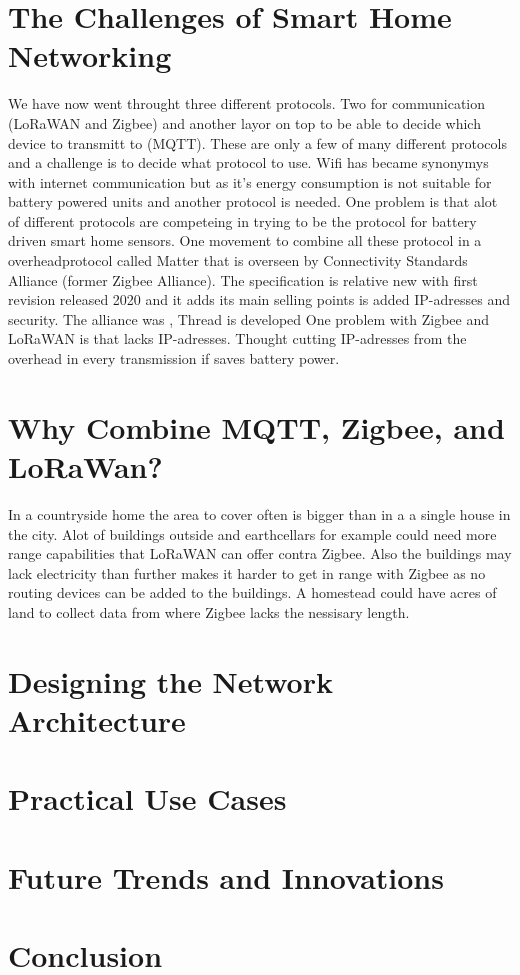 \documentclass[article,a4paper]{IEEEtran}
\begin{document}
    \section{The Challenges of Smart Home Networking}
    We have now went throught three different protocols. Two for communication (LoRaWAN and Zigbee) and another layor on top to be able to decide which device to transmitt to (MQTT). These are only a few of many different protocols and a challenge is to decide what protocol to use. Wifi has became synonymys with internet communication but as it's energy consumption is not suitable for battery powered units and another protocol is needed. One problem is that alot of different protocols are competeing in trying to be the protocol for battery driven smart home sensors. One movement to combine all these protocol in a overheadprotocol called Matter \cite{Matterspec} that is overseen by Connectivity Standards Alliance (former Zigbee Alliance). The specification is relative new with first revision released 2020 and it adds its main selling points is added IP-adresses and security.  The alliance was ,  Thread is developed One problem with Zigbee and LoRaWAN is that lacks IP-adresses. Thought cutting IP-adresses from the overhead in every transmission if saves battery power. 
    \section{Why Combine MQTT, Zigbee, and LoRaWan?}
    In a countryside home the area to cover often is bigger than in a a single house in the city. Alot of buildings outside and earthcellars for example could need more range capabilities that LoRaWAN can offer contra Zigbee. Also the buildings may lack electricity than further makes it harder to get in range with Zigbee as no routing devices can be added to the buildings. A homestead could have acres of land to collect data from where Zigbee lacks the nessisary length.  

    \section{Designing the Network Architecture}

    \section{Practical Use Cases}

    \section{Future Trends and Innovations}

    \section{Conclusion}

\printbibliography
\end{document}
